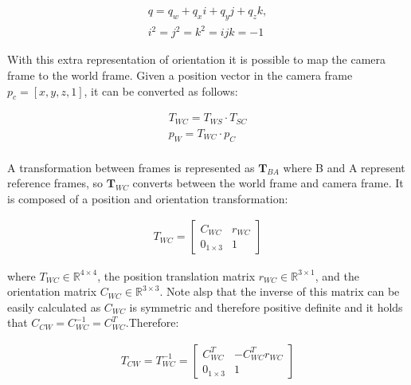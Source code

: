 \documentclass[11pt,twoside]{report}
\begin{document}
\begin{equation}
\begin{aligned}
\label{quaternion}
q = q_{w} + q_{x}i + q_{y}j+q_{z}k, \\
i^{2}=j^{2}=k^{2}=ijk=-1
\end{aligned}
\end{equation}

With this extra representation of orientation it is possible to map the camera frame to the world frame. Given a position vector in the camera frame $p_{c} = [x,y,z,1]$, it can be converted as follows:


\begin{equation}
\begin{aligned}
T_{WC} = T_{WS} \cdot T_{SC} \\
p_{W} = T_{WC} \cdot p_{C} \\
\end{aligned}
\label{matmul_w2c}
\end{equation}

A transformation between frames is represented as $\textbf{T}_{BA}$ where B and A represent reference frames, so $\textbf{T}_{WC}$ converts between the world frame and camera frame. It is composed of a position and orientation transformation:

\begin{equation}
\begin{aligned}
T_{WC} = 
\begin{bmatrix}
C_{WC} & r_{WC} \\
0_{1 \times 3} & 1
\end{bmatrix}
\end{aligned}
\end{equation}

where $T_{WC} \in \mathbb{R}^{4 \times 4}$, the position translation matrix $r_{WC} \in \mathbb{R}^{3 \times 1}$, and the orientation matrix $C_{WC} \in \mathbb{R}^{3 \times 3}$. Note alsp that the inverse of this matrix can be easily calculated as $C_{WC}$ is symmetric and therefore positive definite and it holds that $C_{CW}=C_{WC}^{-1}= C_{WC}^{T}$.Therefore:

\begin{equation}
\begin{aligned}
T_{CW} = T_{WC}^{-1} = 
\begin{bmatrix}
C_{WC}^{T} & -C_{WC}^{T}r_{WC} \\
0_{1 \times 3} & 1
\end{bmatrix}
\end{aligned}
\label{invert_tmatrix}
\end{equation}
\end{document}
